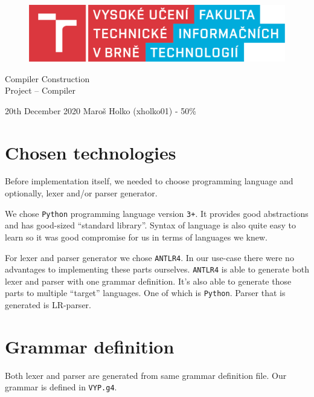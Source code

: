 \documentclass[a4paper, 11pt]{article}
\begin{document}
\begin{titlepage}
\begin{center}

    \vspace{0.5cm}
\begin{figure}[h]
    \centering
    \includegraphics[width=13cm]{fit.png}
\end{figure}
\vspace{0.5cm}
 \LARGE{Compiler Construction}\\ \Huge{Project -- Compiler}\\ 
\end{center}


{\Large 20th December 2020 \hfill Maroš Holko (xholko01) - 50\%}
\end{titlepage}
\newpage

\section{Chosen technologies}

Before implementation itself, we needed to choose programming language and optionally, lexer and/or parser generator.

We chose \texttt{Python} programming language version \texttt{3+}. It provides good abstractions and has good-sized ``standard library''. Syntax of language is also quite easy to learn so it was good compromise for us in terms of languages we knew.

For lexer and parser generator we chose \texttt{ANTLR4}. In our use-case there were no advantages to implementing these parts ourselves. \texttt{ANTLR4} is able to generate both lexer and parser with one grammar definition. It's also able to generate those parts to multiple ``target'' languages. One of which is \texttt{Python}. Parser that is generated is LR-parser.

\section{Grammar definition}
Both lexer and parser are generated from same grammar definition file. Our grammar is defined in \texttt{VYP.g4}. 
\end{document}
